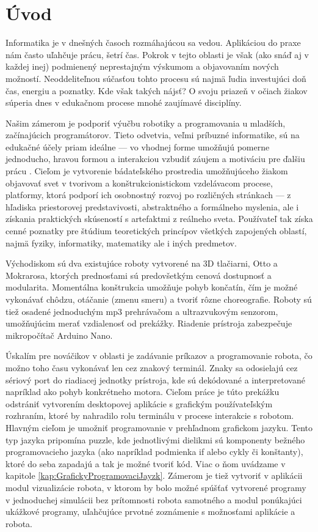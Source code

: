 
\chapter*{Úvod} %

Informatika je v dnešných časoch rozmáhajúcou sa vedou. Aplikáciou do praxe nám často uľahčuje prácu, šetrí čas. Pokrok v tejto oblasti je však (ako snáď aj v každej inej) podmienený neprestajným výskumom a objavovaním nových možností. Neoddeliteľnou súčasťou tohto procesu sú najmä ľudia investujúci doň čas, energiu a poznatky. Kde však takých nájsť? O svoju priazeň v očiach žiakov súperia dnes v edukačnom procese mnohé zaujímavé disciplíny.

Našim zámerom je podporiť výučbu robotiky a programovania u mladších, začínajúcich programátorov. Tieto odvetvia, veľmi príbuzné informatike, sú na edukačné účely priam ideálne --- vo vhodnej forme umožňujú pomerne jednoducho, hravou formou a interakciou vzbudiť záujem a motiváciu pre ďalšiu prácu \cite{parker2019learning}. Cieľom je vytvorenie bádateľského prostredia umožňujúceho žiakom objavovať svet v tvorivom a konštrukcionistickom vzdelávacom procese, platformy, ktorá podporí ich osobnostný rozvoj po rozličných stránkach --- z hľadiska priestorovej predstavivosti, abstraktného a formálneho myslenia, ale i získania praktických skúseností s artefaktmi z reálneho sveta. Používateľ tak získa cenné poznatky pre štúdium teoretických princípov všetkých zapojených oblastí, najmä fyziky, informatiky, matematiky ale i iných predmetov.

Východiskom sú dva existujúce roboty vytvorené na 3D tlačiarni, Otto a Mokrarosa, ktorých prednosťami sú predovšetkým cenová dostupnosť a modularita. Momentálna konštrukcia umožňuje pohyb končatín, čím je možné vykonávať chôdzu, otáčanie (zmenu smeru) a tvoriť rôzne choreografie. Roboty sú tiež osadené jednoduchým mp3 prehrávačom a ultrazvukovým senzorom, umožňujúcim merať vzdialenosť od prekážky. Riadenie prístroja zabezpečuje mikropočítač Arduino Nano.

Úskalím pre nováčikov v oblasti je zadávanie príkazov a programovanie robota, čo možno toho času vykonávať len cez znakový terminál. Znaky sa odosielajú cez sériový port do riadiacej jednotky prístroja, kde sú dekódované a interpretované napríklad ako pohyb konkrétneho motora. Cieľom práce je túto prekážku odstrániť vytvorením desktopovej aplikácie s grafickým používateľským rozhraním, ktoré by nahradilo rolu terminálu v procese interakcie s robotom. Hlavným cieľom je umožniť programovanie v prehľadnom grafickom jazyku. Tento typ jazyka pripomína puzzle, kde jednotlivými dielikmi sú komponenty bežného programovacieho jazyka (ako napríklad podmienka if alebo cykly či konštanty), ktoré do seba zapadajú a tak je možné tvoriť kód. Viac o ňom uvádzame v kapitole \ref{kap:GrafickyProgramovaciJayzk}.
Zámerom je tiež vytvoriť v aplikácii modul vizualizácie robota, v ktorom by bolo možné spúšťať vytvorené programy v jednoduchej simulácii bez prítomnosti robota samotného a modul ponúkajúci ukážkové programy, uľahčujúce prvotné zoznámenie s možnosťami aplikácie a robota.
